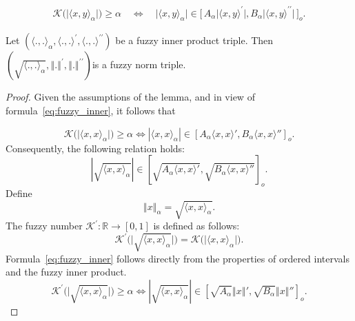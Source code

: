 \documentclass[10pt,a4paper]{amsart}
\newcommand{\norm}[1]{\left\Vert#1\right\Vert}
\begin{document}
	\begin{align}\label{eq:fuzzy_inner}
		\mathcal{K}\bigl(	\big|\langle  x, y \rangle_\alpha \big|\bigr) \ge \alpha 
		\quad \Longleftrightarrow \quad
		\big|\langle  x, y \rangle_\alpha \big| \in \bigl[\, A_\alpha\vert \langle x,y\rangle^\prime \vert,B_\alpha \vert \langle x,y\rangle^{\prime\prime} \vert \,\bigr]_o.
	\end{align}

\begin{lemma}
	Let  $(\langle  ., . \rangle_\alpha,\langle .,.\rangle^\prime,\langle .,.\rangle^{\prime\prime})$ be a fuzzy inner product triple.  Then $(\sqrt{\langle  ., . \rangle_\alpha},\norm{.}^\prime,\norm{.}^{\prime\prime})$is  a fuzzy norm triple.
\end{lemma} 

\begin{proof}
	Given the assumptions of the lemma, and in view of formula~\eqref{eq:fuzzy_inner}, it follows that
	
	\[
	\mathcal{K}\big(\big|\langle  x, x \rangle_\alpha\big|\big) \geq \alpha \Longleftrightarrow |\langle  x, x \rangle_\alpha| \in [ A_\alpha\langle x, x \rangle', B_\alpha\langle x, x \rangle'']_o.
	\]
Consequently, the following relation holds:
	\[
 |\sqrt{\langle  x, x \rangle_\alpha}| \in [ \sqrt{A_\alpha\langle x, x \rangle'}, \sqrt{B_\alpha\langle x, x \rangle''}]_o.
\]
	Define 
\begin{equation}\label{eq:norm_alpha,inner product_alpha}
	\norm{x}_\alpha = \sqrt{\langle  x, x \rangle_\alpha}.
\end{equation}
The fuzzy number $\mathcal{K}^\prime:\mathbb{R}\to [0,1]$ is defined as follows:
\[\mathcal{K^\prime}\big(\big|\sqrt{\langle  x, x \rangle_\alpha}\big|\big) =\mathcal{K}\big(\big|\langle  x, x \rangle_\alpha\big|\big). \]
	Formula~\eqref{eq:fuzzy_inner} follows directly from the properties of ordered intervals and the fuzzy inner product.
		\[
	\mathcal{K^\prime}\big(\big|\sqrt{\langle  x, x \rangle_\alpha}\big|\big) \geq \alpha \Longleftrightarrow |\sqrt{\langle  x, x \rangle_\alpha}| \in [ \sqrt{A_\alpha}\norm{x}', \sqrt{B_\alpha}\norm{x}'']_o.
	\]
\end{proof}
\end{document}
